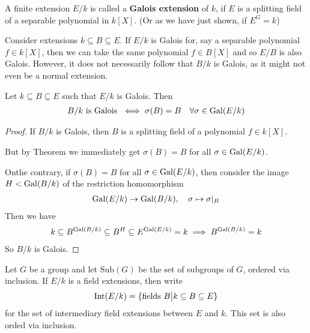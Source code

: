 \begin{dfn}[]
  A finite extension $E/k$ is called a \textbf{Galois extension} of $k$, if $E$ is a splitting field of a separable polynomial in $k[X]$. (Or as we have just shown, if $E^{G} = k$)
\end{dfn}

Consider extensions $k \subseteq B \subseteq E$. 
If $E/k$ is Galois for, say a separable polynomial $f \in k[X]$, then we can take the same polynomial $f \in B[X]$ and so $E/B$ is also Galois.
However, it does not necessarily follow that $B/k$ is Galois, as it might not even be a normal extension.



\begin{prop}[]
Let $k \subseteq B \subseteq E$ such that $E/k$ is Galois.
Then
\begin{align*}
  B/k \text{ is Galois } \iff  \sigma(B) = B  \quad \forall \sigma \in \operatorname{Gal}(E/k)
\end{align*}
\end{prop}

\begin{proof}
  If $B/k$ is Galois, then $B$ is a splitting field of a polynomial $f \in k[X]$.

  But by Theorem %
  we immediately get $\sigma(B) = B$ for all $\sigma \in \operatorname{Gal}(E/k)$.

  Onthe contrary, if $\sigma(B) = B$ for all $\sigma \in \operatorname{Gal}(E/k)$, then consider the image $H < \operatorname{Gal}(B/k)$ of the restriction homomorphism
  \begin{align*}
    \operatorname{Gal}(E/k) \to  \operatorname{Gal}(B/k), \quad \sigma \mapsto  \sigma|_{B}
  \end{align*}
  Then we have
  \begin{align*}
    k \subseteq B^{\operatorname{Gal}(B/k)} \subseteq B^{H} \subseteq E^{\operatorname{Gal}(E/k)} = k \implies B^{\operatorname{Gal}(B/k)} = k
  \end{align*}
  So $B/k$ is Galois.
\end{proof}



Let $G$ be a group and let $\text{Sub}(G)$ be the set of subgroups of $G$, ordered via inclusion.
If $E/k$ is a field extensions, then write 
\begin{align*}
  \operatorname{Int}(E/k) = \{\text{fields }B \big\vert k \subseteq B \subseteq E\}
\end{align*}
for the set of intermediary field extensions between $E$ and $k$.
This set is also orded via inclusion.

